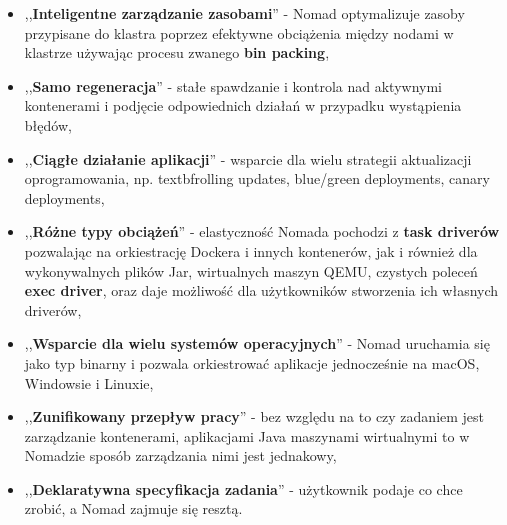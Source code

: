 \documentclass{iiuwb}
\begin{document}
\begin{itemize}
  \item ,,\textbf{Inteligentne zarządzanie zasobami}'' - Nomad
  optymalizuje zasoby przypisane do klastra poprzez efektywne 
  obciążenia między nodami w klastrze używając procesu zwanego 
  \textbf{bin packing}, 
  \item ,,\textbf{Samo regeneracja}'' - stałe spawdzanie 
  i kontrola nad aktywnymi kontenerami i podjęcie 
  odpowiednich działań w przypadku wystąpienia błędów,
  \item ,,\textbf{Ciągłe działanie aplikacji}'' - wsparcie 
  dla wielu strategii aktualizacji oprogramowania, np. 
  textbf{rolling updates, blue/green deployments, canary
  deployments},
  \item ,,\textbf{Różne typy obciążeń}'' - elastyczność Nomada
  pochodzi z \textbf{task driverów} pozwalając na orkiestrację
  Dockera i innych kontenerów, jak i również dla wykonywalnych 
  plików Jar, wirtualnych maszyn QEMU, czystych poleceń \textbf{exec driver},
  oraz daje możliwość dla użytkowników stworzenia ich własnych
  driverów,
  \item ,,\textbf{Wsparcie dla wielu systemów operacyjnych}'' - 
  Nomad uruchamia się jako typ binarny i pozwala orkiestrować
  aplikacje jednocześnie na macOS, Windowsie i Linuxie,
  \item ,,\textbf{Zunifikowany przepływ pracy}'' - bez względu
  na to czy zadaniem jest zarządzanie kontenerami, aplikacjami Java
  maszynami wirtualnymi to w Nomadzie sposób zarządzania nimi
  jest jednakowy,
  \item ,,\textbf{Deklaratywna specyfikacja zadania}'' - użytkownik 
  podaje co chce zrobić, a Nomad zajmuje się resztą.
\end{itemize}
\end{document}
